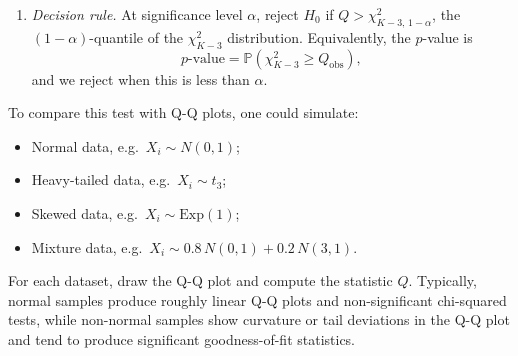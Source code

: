 \documentclass[letterpaper]{article}
\begin{document}
\begin{enumerate}
			\item \textit{Decision rule.}
			At significance level $\alpha$, reject $H_0$ if $Q>\chi^2_{K-3,\,1-\alpha}$, the $(1-\alpha)$-quantile of the $\chi^2_{K-3}$ distribution. Equivalently, the $p$-value is
			$$p\text{-value}=\mathbb{P}\!\left(\chi^2_{K-3}\ge Q_{\mathrm{obs}}\right),$$
			and we reject when this is less than $\alpha$.
		\end{enumerate}
		
		To compare this test with Q-Q plots, one could simulate:
		\begin{itemize}
			\item Normal data, e.g.\ $X_i\sim N(0,1)$;
			\item Heavy-tailed data, e.g.\ $X_i\sim t_3$;
			\item Skewed data, e.g.\ $X_i\sim \mathrm{Exp}(1)$;
			\item Mixture data, e.g.\ $X_i\sim 0.8\,N(0,1)+0.2\,N(3,1)$.
		\end{itemize}
		For each dataset, draw the Q-Q plot and compute the statistic $Q$. Typically, normal samples produce roughly linear Q-Q plots and non-significant chi-squared tests, while non-normal samples show curvature or tail deviations in the Q-Q plot and tend to produce significant goodness-of-fit statistics.
		
		
		\clearpage
		
	
\end{document}
